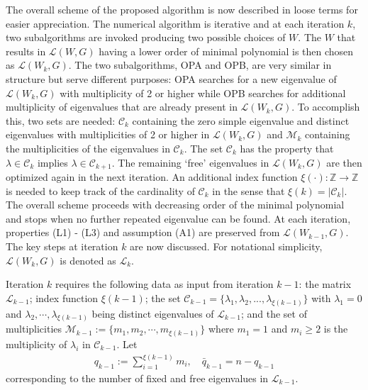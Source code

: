 \documentclass[onecolumn,reviewcopy]{autart}
\def \L{\mathcal{L}}
\def \C{\mathcal{C}}
\def \M{\mathcal{M}}
\begin{document}
The overall scheme of the proposed algorithm is now described in loose terms for easier appreciation.
The numerical algorithm is iterative and at each iteration $k$, two subalgorithms are invoked producing two possible choices of $W$. The $W$ that results in $\L(W,G)$ having a lower order of minimal polynomial is then chosen as $\L(W_k,G)$. The two subalgorithms, OPA and OPB, are very similar in structure but serve different purposes: OPA searches for a new eigenvalue of $\L(W_k,G)$ with multiplicity of 2 or higher while OPB searches for additional multiplicity of eigenvalues that are already present in $\L(W_k,G)$. To accomplish this, two sets are needed: $\C_k$ containing the zero simple eigenvalue and distinct eigenvalues with multiplicities of 2 or higher in $\L(W_k,G)$ and $\M_k$ containing the multiplicities of the eigenvalues in $\C_k$. The set $\C_k$ has the property that $\lambda \in \C_{k}$ implies $ \lambda \in \C_{k+1}$. The remaining `free' eigenvalues in $\L(W_k,G)$ are then optimized again in the next iteration. An additional index function $\xi(\cdot):\mathbb{Z} \rightarrow \mathbb{Z}$ is needed to keep track of the cardinality of $\C_{k}$ in the sense that $\xi(k)=|\C_{k}|$. The overall scheme proceeds with decreasing order of the minimal polynomial and stops when no further repeated eigenvalue can be found. At each iteration, properties (L1) - (L3) and assumption (A1) are preserved from $\L(W_{k-1},G)$. The key steps at iteration $k$ are now discussed. For notational simplicity, $\L(W_k,G)$ is denoted as $\L_k$.

Iteration $k$ requires the following data as input from iteration $k-1$: the matrix $\L_{k-1}$; index function $\xi(k-1)$; the set $\C_{k-1}=\{\lambda_1, \lambda_2, ..., \lambda_{\xi(k-1)}\}$ with $\lambda_1=0$ and $\lambda_2,\cdots, \lambda_{\xi(k-1)}$ being distinct eigenvalues of $\L_{k-1}$; and the set of multiplicities  $\M_{k-1}:=\{m_1, m_2, \cdots, m_{\xi(k-1)}\}$ where $m_1=1$ and $m_i \ge 2$ is the multiplicity of $\lambda_i$ in  $\C_{k-1}$. Let
\begin{align}\label{eqn:qkminus1}
q_{k-1}:=\sum_{i=1}^{\xi(k-1)} m_i,\quad \bar{q}_{k-1}=n-q_{k-1}
\end{align}
corresponding to the number of fixed and free eigenvalues in $\L_{k-1}$.
\end{document}
